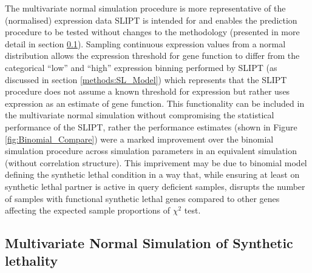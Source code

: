 The multivariate normal simulation procedure is more representative of the (normalised) expression data SLIPT is intended for and enables the prediction procedure to be tested without changes to the methodology (presented in more detail in section \ref{results:simulation_mvtnorm}). Sampling continuous expression values from a normal distribution allows the expression threshold for gene function to differ from the categorical ``low'' and ``high'' expression binning performed by SLIPT (as discussed in section \ref{methods:SL_Model}) which represents that the SLIPT procedure does not assume a known threshold for expression but rather uses expression as an estimate of gene function. This functionality can be included in the multivariate normal simulation without compromising the statistical performance of the SLIPT, rather the performance estimates (shown in Figure \ref{fig:Binomial_Compare}) were a marked improvement over the binomial simulation procedure across simulation parameters in an equivalent simulation (without correlation structure). This imprivement may be due to binomial model defining the synthetic lethal condition in a way that, while ensuring at least on synthetic lethal partner is active in query deficient samples, disrupts the number of samples with functional synthetic lethal genes compared to other genes affecting the expected sample proportions of $\chi^2$ test.

\subsection{Multivariate Normal Simulation of Synthetic lethality} \label{results:simulation_mvtnorm}

